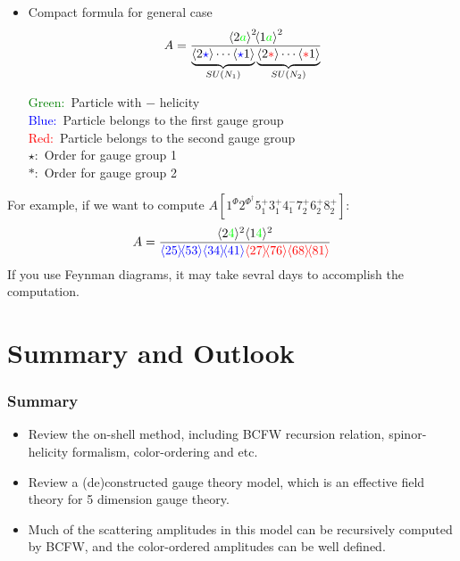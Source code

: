 \documentclass{beamer}
\newcommand{\avg}[1]{\langle #1 \rangle}
\newcommand{\mdavg}[2]{\langle #1 \rangle\!\langle #2 \rangle}
\newcommand{\asqu}[1]{{\langle#1\rangle}^2}
\begin{document}
\begin{frame}
    \begin{itemize}
        \item Compact formula for general case
        \begin{equation*}
            A=\frac{\asqu{2\textcolor{green}{a}}\!\asqu{1\textcolor{green}{a}}}{\underbrace{\avg{2\textcolor{blue}{\star}}\cdots \avg{\textcolor{blue}{\star}1}}_{SU(N_1)}\underbrace{\avg{2\textcolor{red}{\ast} }\cdots \avg{\textcolor{red}{\ast} 1}}_{SU(N_2)}}
        \end{equation*} 
        \begin{minipage}{0.7\textwidth}
            \raggedright  %
            \textcolor{green}{Green:} \,Particle with $-$ helicity\\
            \textcolor{blue}{Blue:}\, Particle belongs to the first gauge group\\
            \textcolor{red}{Red:}\, Particle belongs to the second gauge group\\
            $\star$: \,Order for gauge group 1\\
            $\ast$: \,Order for gauge group 2 
            \end{minipage}
       
    \end{itemize}
    \pause
    For example, if we want to compute $A[1^\Phi2^{\Phi^\dagger}5_1^+3_1^+4_1^-7_2^+6_2^+8_2^+]$:
    \begin{equation*}
        A=\frac{\avg{2\textcolor{green}{4}}^2\avg{1\textcolor{green}{4}}^2}{\textcolor{blue}{\mdavg{25}{53}\mdavg{34}{41}}\textcolor{red}{\mdavg{27}{76}\mdavg{68}{81}}}
    \end{equation*}
    If you use Feynman diagrams, it may take sevral days to accomplish the computation.
\end{frame}

\section{Summary and Outlook}
\begin{frame}
    \frametitle{Summary}
    \begin{itemize}
        \item Review the on-shell method, including BCFW recursion relation, spinor-helicity formalism, color-ordering and etc.
        \item Review a (de)constructed gauge theory model, which is an effective field theory for 5 dimension gauge theory.
        \item Much of the scattering amplitudes in this model can be recursively computed by BCFW, and the color-ordered amplitudes can be well defined.
    \end{itemize}
\end{frame}
\end{document}
